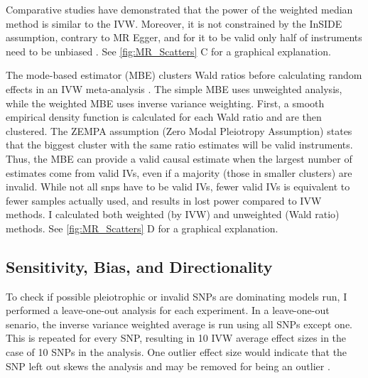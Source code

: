 \documentclass[journal,article,submit,moreauthors,pdftex]{Definitions/mdpi}
\begin{document}
Comparative studies have demonstrated that the power of the weighted median method is similar to the IVW. Moreover, it is not constrained by the InSIDE assumption, contrary to MR Egger, and for it to be valid only half of instruments need to be unbiased \cite{hemani_evaluating_2018}.  See \ref{fig:MR_Scatters} C for a graphical explanation. 

The mode-based estimator (MBE) clusters Wald ratios before calculating random effects in an IVW meta-analysis \citep{hartwigRobustInferenceSummary2017a}. The simple MBE uses unweighted analysis, while the weighted MBE uses inverse variance weighting. First, a smooth empirical density function is calculated for each Wald ratio and are then clustered. The ZEMPA assumption (Zero Modal Pleiotropy Assumption) states that the biggest cluster with the same ratio estimates will be valid instruments. Thus, the MBE can provide a valid causal estimate when the largest number of estimates come from valid IVs, even if a majority (those in smaller clusters) are invalid. While not all snps have to be valid IVs, fewer valid IVs is equivalent to fewer samples actually used, and results in lost power compared to IVW methods. 
I calculated both weighted (by IVW) and unweighted (Wald ratio) methods. See \ref{fig:MR_Scatters} D for a graphical explanation. 

\subsection{Sensitivity, Bias, and Directionality}

To check if possible pleiotrophic or invalid SNPs are dominating models run, I performed a leave-one-out analysis for each experiment. In a leave-one-out senario, the inverse variance weighted average is run using all SNPs except one. This is repeated for every SNP, resulting in 10 IVW average effect sizes in the case of 10 SNPs in the analysis. One outlier effect size would indicate that the SNP left out skews the analysis and may be removed for being an outlier \citep{hemaniOrientingCausalRelationship2017}.
\end{document}
